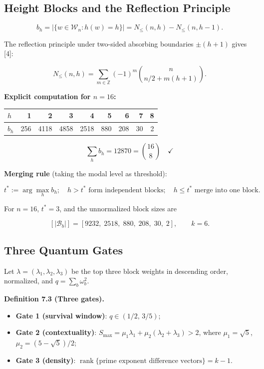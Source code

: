 \documentclass[
  11pt,
]{article}
\newcounter{none} %
\providecommand{\tightlist}{%
  \setlength{\itemsep}{0pt}\setlength{\parskip}{0pt}}
\begin{document}
\subsection{Height Blocks and the Reflection
Principle}\label{height-blocks-and-the-reflection-principle}

\[
b_h = \bigl\lvert\{w\in\mathcal{W}_n : h(w)=h\}\bigr\rvert = N_\le(n,h)-N_\le(n,h-1).
\tag{7.3}
\]

The reflection principle under two-sided absorbing boundaries
\(\pm(h+1)\) gives {[}4{]}:

\[
N_\le(n,h) = \sum_{m\in\mathbb Z}(-1)^m\binom{n}{n/2+m(h+1)}.
\tag{7.4}
\]

\textbf{Explicit computation for \(n=16\):}

{\def\LTcaptype{none} %
\begin{longtable}[]{@{}lrrrrrrrr@{}}
\toprule\noalign{}
\(h\) & 1 & 2 & 3 & 4 & 5 & 6 & 7 & 8 \\
\midrule\noalign{}
\endhead
\bottomrule\noalign{}
\endlastfoot
\(b_h\) & 256 & 4118 & 4858 & 2518 & 880 & 208 & 30 & 2 \\
\end{longtable}
}

\[
\sum_h b_h = 12870 = \binom{16}{8} \quad\checkmark
\tag{7.5}
\]

\textbf{Merging rule} (taking the modal level as threshold):

\[
t^* := \arg\max_h b_h; \quad h>t^* \text{ form independent blocks}; \quad h\le t^* \text{ merge into one block}.
\tag{7.6}
\]

For \(n=16\), \(t^*=3\), and the unnormalized block sizes are

\[
[\rvert\mathcal{B}_b\rvert] = [9232,\;2518,\;880,\;208,\;30,\;2], \qquad k=6.
\tag{7.7}
\]

\subsection{Three Quantum Gates}\label{three-quantum-gates}

Let \(\lambda=(\lambda_1,\lambda_2,\lambda_3)\) be the top three block
weights in descending order, normalized, and \(q=\sum_b\omega_b^2\).

\textbf{Definition 7.3 (Three gates).}

\begin{itemize}
\tightlist
\item
  \textbf{Gate 1 (survival window)}: \(q\in(1/2,\,3/5)\);
\item
  \textbf{Gate 2 (contextuality)}:
  \(S_{\max}=\mu_1\lambda_1+\mu_2(\lambda_2+\lambda_3)>2\), where
  \(\mu_1=\sqrt5\), \(\mu_2=(5-\sqrt5)/2\);
\item
  \textbf{Gate 3 (density)}:
  \(\operatorname{rank}\{\text{prime exponent difference vectors}\}=k-1\).
\end{itemize}
\end{document}
